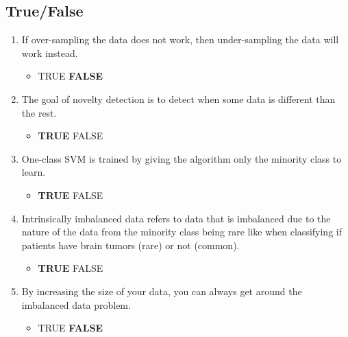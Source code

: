 \documentclass[a4paper]{article}
\newcommand{\T}{\begin{itemize}\item[] \begin{center} 		\textbf{TRUE} FALSE \end{center}\end{itemize}}
\newcommand{\F}{\begin{itemize}\item[] \begin{center} TRUE \textbf{FALSE} \end{center}\end{itemize}}
\begin{document}
\subsection{True/False}
\begin{enumerate}
\item If over-sampling the data does not work, then under-sampling the data will work instead. \F
\item The goal of novelty detection is to detect when some data is different than the rest. \T
\item One-class SVM is trained by giving the algorithm only the minority class to learn. \T
\item Intrinsically imbalanced data refers to data that is imbalanced due to the nature of the data from the minority class being rare like when classifying if patients have brain tumors (rare) or not (common).  \T
\item By increasing the size of your data, you can always get around the imbalanced data problem. \F
\end{enumerate}
\end{document}
